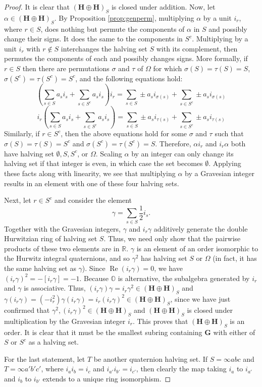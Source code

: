 \documentclass[10pt]{amsart}
\newcommand{\R}{\mathbb{R}}
\renewcommand{\O}{\mathbb{O}}
\newcommand{\HH}{\mathbf{H}}
\newcommand{\G}{\mathbf{G}}
\DeclareMathOperator*{\re}{Re}
\newcommand{\norm}[1]{\left[#1\right]}
\begin{document}
\begin{proof}
It is clear that $(\HH \oplus \HH)_S$ is closed under addition.  Now, let $\alpha \in (\HH \oplus \HH)_S$.  By Proposition \ref{prop:genperm}, multiplying $\alpha$ by a unit $i_r$, where $r \in S$, does nothing but permute the components of $\alpha$ in $S$ and possibly change their signs.  It does the same to the components in $S^c$.  Multiplying by a unit $i_r$ with $r \not \in S$ interchanges the halving set $S$ with its complement, then permutes the components of each and possibly changes signs.  More formally, if $r \in S$ then there are permutations $\sigma$ and $\tau$ of $\Omega$ for which $\sigma(S) = \tau(S) = S$, $\sigma(S^c) = \tau(S^c) = S^c$, and the following equations hold:
$$
\left( \sum_{s \in S} a_s i_s + \sum_{s \in S^c} a_s i_s \right) i_r = \sum_{s \in S} \pm a_s i_{\sigma(s)} + \sum_{s \in S^c} \pm a_s i_{\sigma(s)}
$$
$$
i_r \left( \sum_{s \in S} a_s i_s + \sum_{s \in S^c} a_s i_s \right) = \sum_{s \in S} \pm a_s i_{\tau(s)} + \sum_{s \in S^c} \pm a_s i_{\tau(s)}
$$
Similarly, if $r \in S^c$, then the above equations hold for some $\sigma$ and $\tau$ such that $\sigma(S) = \tau(S) = S^c$ and $\sigma(S^c) = \tau(S^c) = S$.  Therefore, $\alpha i_r$ and $i_r \alpha$ both have halving set $\emptyset, S, S^c$, or $\Omega$.  Scaling $\alpha$ by an integer can only change its halving set if that integer is even, in which case the set becomes $\emptyset$.  Applying these facts along with linearity, we see that multiplying $\alpha$ by a Gravesian integer results in an element with one of these four halving sets.

Next, let $r \in S^c$ and consider the element
$$
\gamma = \sum_{s \in S} \frac12 i_s.
$$
Together with the Gravesian integers, $\gamma$ and $i_r \gamma$ additively generate the double Hurwitzian ring of halving set $S$.  Thus, we need only show that the pairwise products of these two elements are in $\R$.  $\gamma$ is an element of an order isomorphic to the Hurwitz integral quaternions, and so $\gamma^2$ has halving set $S$ or $\Omega$ (in fact, it has the same halving set as $\gamma$).  Since $\re(i_r \gamma) = 0$, we have $(i_r \gamma)^2 = -\norm{i_r \gamma} = -1$.  Because $\O$ is alternative, the subalgebra generated by $i_r$ and $\gamma$ is associative.  Thus, $(i_r \gamma)\gamma = i_r \gamma^2 \in (\HH \oplus \HH)_S$ and $\gamma(i_r \gamma) = (-i_r^2)\gamma(i_r \gamma) = i_r(i_r\gamma)^2 \in (\HH \oplus \HH)_S$, since we have just confirmed that $\gamma^2, (i_r\gamma)^2 \in (\HH \oplus \HH)_S$ and $(\HH \oplus \HH)_S$ is closed under multiplication by the Gravesian integer $i_r$.  This proves that $(\HH \oplus \HH)_S$ is an order.  It is clear that it must be the smallest subring containing $\G$ with either of $S$ or $S^c$ as a halving set.

For the last statement, let $T$ be another quaternion halving set.  If $S = \infty a b c$ and $T = \infty a' b' c'$, where $i_ai_b = i_c$ and $i_{a'} i_{b'} = i_{c'}$, then clearly the map taking $i_{a}$ to $i_{a'}$ and $i_{b}$ to $i_{b'}$ extends to a unique ring isomorphism.
\end{proof}
\end{document}

